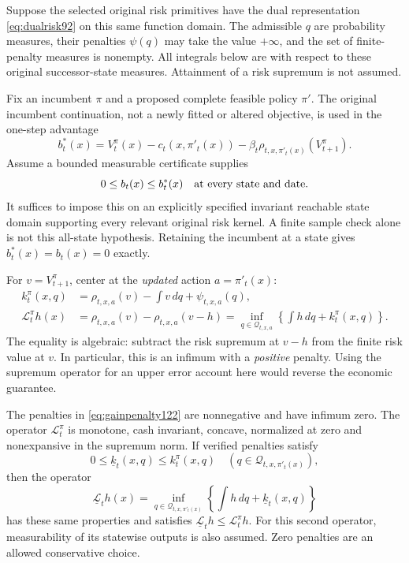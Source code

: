 Suppose the selected original risk primitives have the dual representation
\eqref{eq:dualrisk92} on this same function domain. The admissible $q$ are
probability measures, their penalties $\psi(q)$ may take the value $+\infty$,
and the set of finite-penalty measures is nonempty. All integrals below are
with respect to these original successor-state measures. Attainment of a
risk supremum is not assumed.

Fix an incumbent $\pi$ and a proposed complete feasible policy $\pi'$.
The original incumbent continuation, not a newly fitted or altered
objective, is used in the one-step advantage
\begin{equation}\label{eq:incumbentadvantage122}
 b_t^*(x)=V_t^\pi(x)-c_t(x,\pi'_t(x))
       -\beta_t\rho_{t,x,\pi'_t(x)}(V_{t+1}^\pi).
\end{equation}
Assume a bounded measurable certificate supplies
\begin{equation}\label{eq:advantagelower122}
                 0\le b_t(x)\le b_t^*(x)
                 \quad\hbox{at every state and date.}
\end{equation}
It suffices to impose this on an explicitly specified invariant reachable
state domain supporting every relevant original risk kernel. A finite
sample check alone is not this all-state hypothesis. Retaining the incumbent
at a state gives $b_t^*(x)=b_t(x)=0$ exactly.

For $v=V_{t+1}^\pi$, center at the \emph{updated} action $a=\pi'_t(x)$:
\begin{align}
 k_t^\pi(x,q)
  &=\rho_{t,x,a}(v)-\int v\,dq+\psi_{t,x,a}(q),\label{eq:gainpenalty122}\\
 \mathcal L_t^\pi h(x)
  &=\rho_{t,x,a}(v)-\rho_{t,x,a}(v-h)
    =\inf_{q\in\mathcal Q_{t,x,a}}
           \left\{\int h\,dq+k_t^\pi(x,q)\right\}.
       \label{eq:lowercenter122}
\end{align}
The equality is algebraic: subtract the risk supremum at $v-h$ from the
finite risk value at $v$. In particular, this is an infimum with a
\emph{positive} penalty. Using the supremum operator for an upper error
account here would reverse the economic guarantee.

\begin{lemma}
\label{lem:lowercenter122}
The penalties in \eqref{eq:gainpenalty122} are nonnegative and have
infimum zero. The operator $\mathcal L_t^\pi$ is monotone, cash invariant,
concave, normalized at zero and nonexpansive in the supremum norm.
If verified penalties satisfy
\[
        0\le\underline k_t(x,q)\le k_t^\pi(x,q)
                    \quad(q\in\mathcal Q_{t,x,\pi'_t(x)}),
\]
then the operator
\[
 \underline{\mathcal L}_t h(x)
   =\inf_{q\in\mathcal Q_{t,x,\pi'_t(x)}}
            \left\{\int h\,dq+\underline k_t(x,q)\right\}
\]
has these same properties and satisfies
$\underline{\mathcal L}_t h\le\mathcal L_t^\pi h$.
For this second operator, measurability of its statewise outputs is also
assumed. Zero penalties are an allowed conservative choice.
\end{lemma}

